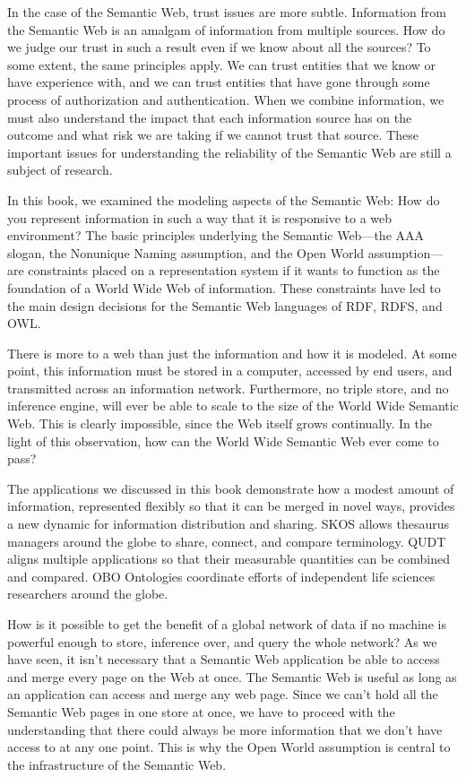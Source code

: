 In the case of the Semantic Web, trust issues are more subtle.
Information from the Semantic Web is
an amalgam of information from multiple sources. How do we judge our
trust in such a result even if we know about all the sources? To some
extent, the same principles apply. We can trust entities that we know or
have experience with, and we can trust entities that have gone through
some process of authorization and authentication. When we combine
information, we must also understand the impact that each information
source has on the outcome and what risk we are taking if we cannot trust
that source. These important issues for understanding the reliability of
the Semantic Web are still a subject of research.

In this book, we examined the modeling aspects of the Semantic Web: How
do you represent information in such a way that it is responsive to a
web environment? The basic principles underlying the Semantic Web---the
AAA slogan, the Nonunique Naming assumption, and the Open World
assumption---are constraints placed on a representation system if it
wants to function as the foundation of a World Wide Web of information.
These constraints have led to the main design decisions for the Semantic
Web languages of RDF, RDFS, and OWL.

There is more to a web than just the information and how it is modeled.
At some point, this information must be stored in a computer, accessed
by end users, and transmitted across an information network.
Furthermore, no triple store, and no inference engine, will ever be able
to scale to the size of the World Wide Semantic Web. This is clearly
impossible, since the Web itself grows continually. In the light of this
observation, how can the World Wide Semantic Web ever come to pass?

The applications we discussed in this book demonstrate how a modest
amount of information, represented flexibly so that it can be merged in
novel ways, provides a new dynamic for information distribution and
sharing. SKOS allows thesaurus managers around the globe to share,
connect, and compare terminology. QUDT aligns multiple applications so
that their measurable quantities can be combined and compared. OBO
Ontologies coordinate efforts of independent life sciences researchers
around the globe.

How is it possible to get the benefit of a global network of data if no
machine is powerful enough to
store, inference over, and query the whole network? As we have seen, it
isn't necessary that a Semantic Web application be able to access and
merge every page on the Web at once. The Semantic Web is useful as long
as an application can access and merge any web page. Since we can't hold
all the Semantic Web pages in one store at once, we have to proceed with
the understanding that there could always be more information that we
don't have access to at any one point. This is why the Open World
assumption is central to the infrastructure of the Semantic Web.

